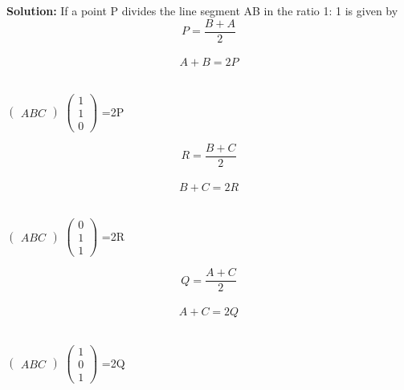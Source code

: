 \documentclass[10pt,a4paper]{report}
\begin{document}
\begin{multicols}{2}
\textbf{Solution:}
If a point P divides the line segment AB in the ratio 1: 1 is given by
\vspace{2mm}
\begin{equation*}
P= \frac{B+A}{2}
\end{equation*}\\
\begin{equation*}
 A+B=2P
\end{equation*} \\

\begin{center}


$ \begin{pmatrix} 
A
B
C
\end{pmatrix} $ 
$ \begin{pmatrix} 
1 \\
1 \\
0
\end{pmatrix} $ =2P\\
\end{center}
\vspace{3mm}
\begin{equation*}
R=\frac{B+C}{2}
\end{equation*} \\
\begin{equation*}
B+C=2R
\end{equation*} \\
\begin{center}
$ \begin{pmatrix} 
A
B
C
\end{pmatrix} $ 
$ \begin{pmatrix} 
0 \\
1 \\
1
\end{pmatrix} $ =2R\\
\end{center}
\begin{equation*}
Q=\frac{A+C}{2}
\end{equation*} \\
\begin{equation*}
A+C=2Q
\end{equation*} \\
\begin{center}
$ \begin{pmatrix} 
A
B
C
\end{pmatrix} $ 
$ \begin{pmatrix} 
1 \\
0 \\
1
\end{pmatrix} $ =2Q\\

\end{center}
\end{multicols}
\end{document}
